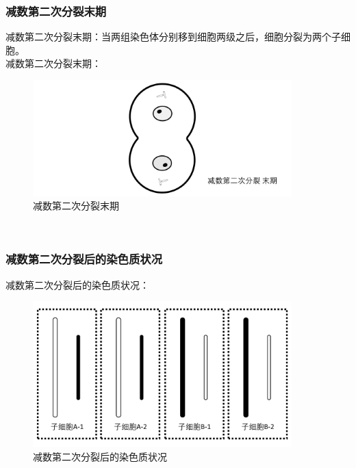 \documentclass[UTF8]{ctexart}
\begin{document}
\subsubsection{减数第二次分裂末期}
    减数第二次分裂末期：当两组染色体分别移到细胞两级之后，细胞分裂为两个子细胞。\\[4mm]
    减数第二次分裂末期：
    \begin{figure}[h]
        \begin{center}
            \includegraphics[width=10cm]{BiologyImage/43.jpg}
            \caption{减数第二次分裂末期}
        \end{center}
    \end{figure}\\

\subsubsection{减数第二次分裂后的染色质状况}
    减数第二次分裂后的染色质状况：
    \begin{figure}[h]
        \begin{center}
            \includegraphics[width=10cm]{BiologyImage/47.jpg}
            \caption{减数第二次分裂后的染色质状况}
        \end{center}
    \end{figure}

\newpage
\end{document}
